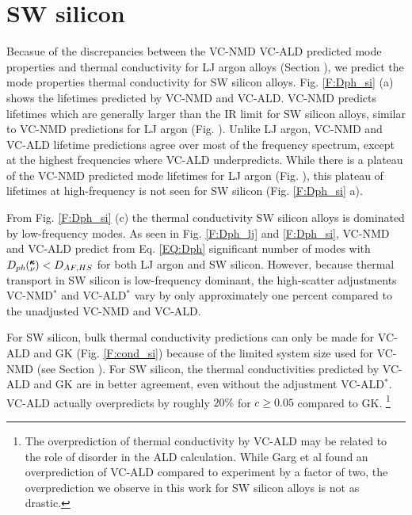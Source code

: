 \documentclass[aps,prb,onecolumn,preprint,superscriptaddress,amsmath,amssymb,floatfix]{revtex4}
\newcommand{\kv}{\mspace{-4.0mu}\left(\mspace{-8.0mu}
\begin{smallmatrix}&\pmb{\kappa} \\&\nu\end{smallmatrix}
\mspace{-3.0mu}\right)}
\begin{document}

\clearpage

\section{\label{S:SW}SW silicon}

Becasue of the discrepancies between the VC-NMD VC-ALD predicted mode 
properties and thermal conductivity for LJ argon alloys (Section ), 
we predict the mode properties thermal conductivity for 
SW silicon alloys. Fig. \ref{F:Dph_si} (a) shows the lifetimes 
predicted by VC-NMD and VC-ALD. VC-NMD predicts lifetimes which 
are generally larger than the IR limit for SW silicon alloys, similar 
to VC-NMD predictions for LJ argon (Fig. ).   
Unlike LJ argon, VC-NMD and VC-ALD lifetime predictions agree over most 
of the frequency spectrum, except at the highest frequencies where 
VC-ALD underpredicts. While there is a plateau of the VC-NMD 
predicted mode lifetimes 
for LJ argon (Fig. ), this 
plateau of lifetimes at high-frequency is not seen for SW 
silicon (Fig. \ref{F:Dph_si} a). 

From Fig. \ref{F:Dph_si} (c) the thermal conductivity SW silicon alloys is 
dominated by 
low-frequency modes. As seen in Fig. \ref{F:Dph_lj} and \ref{F:Dph_si}, 
VC-NMD and VC-ALD predict from Eq. \eqref{EQ:Dph} significant 
number of modes with  
$D_{ph}\kv < D_{AF,HS}$ for both LJ argon and SW silicon. However, 
because thermal transport in SW silicon is low-frequency dominant, 
the high-scatter adjustments VC-NMD$^*$ and VC-ALD$^*$ vary by only 
approximately one percent compared to the unadjusted VC-NMD and VC-ALD. 

For SW silicon, bulk thermal conductivity 
predictions can only be made for VC-ALD and GK (Fig. \ref{F:cond_si}) 
because of the 
limited system size used for VC-NMD 
(see Section ).
For SW silicon, the thermal conductivities predicted by VC-ALD and GK 
are in better agreement, even without the adjustment VC-ALD$^*$. VC-ALD 
actually overpredicts by roughly $20\%$ for $c \ge 0.05$ compared to GK.
\footnote[6]
{The overprediction of thermal conductivity by VC-ALD 
may be related to the role of disorder in the ALD calculation.
\cite{garg_role_2011,turney_predicting_2009} While Garg et al found 
an overprediction of VC-ALD compared to experiment by a factor of two, 
the overprediction 
we observe in this work for SW silicon alloys is not as drastic.}   
\end{document}
